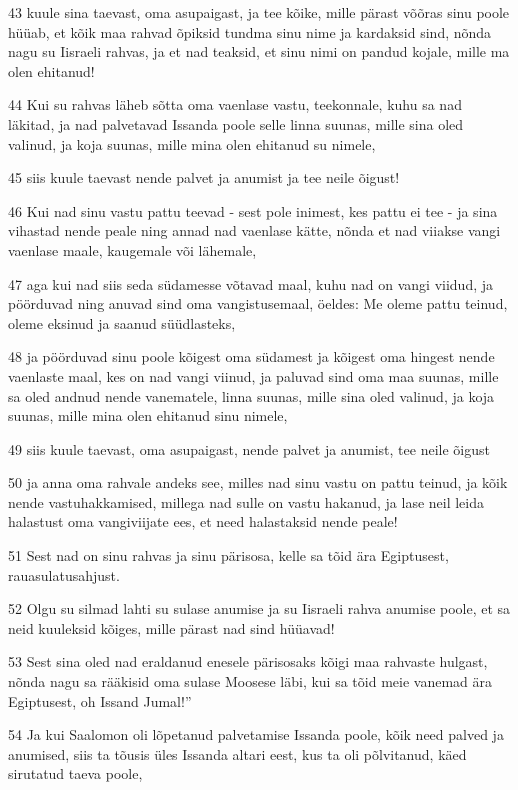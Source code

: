 \par 43 kuule sina taevast, oma asupaigast, ja tee kõike, mille pärast võõras sinu poole hüüab, et kõik maa rahvad õpiksid tundma sinu nime ja kardaksid sind, nõnda nagu su Iisraeli rahvas, ja et nad teaksid, et sinu nimi on pandud kojale, mille ma olen ehitanud!
\par 44 Kui su rahvas läheb sõtta oma vaenlase vastu, teekonnale, kuhu sa nad läkitad, ja nad palvetavad Issanda poole selle linna suunas, mille sina oled valinud, ja koja suunas, mille mina olen ehitanud su nimele,
\par 45 siis kuule taevast nende palvet ja anumist ja tee neile õigust!
\par 46 Kui nad sinu vastu pattu teevad - sest pole inimest, kes pattu ei tee - ja sina vihastad nende peale ning annad nad vaenlase kätte, nõnda et nad viiakse vangi vaenlase maale, kaugemale või lähemale,
\par 47 aga kui nad siis seda südamesse võtavad maal, kuhu nad on vangi viidud, ja pöörduvad ning anuvad sind oma vangistusemaal, öeldes: Me oleme pattu teinud, oleme eksinud ja saanud süüdlasteks,
\par 48 ja pöörduvad sinu poole kõigest oma südamest ja kõigest oma hingest nende vaenlaste maal, kes on nad vangi viinud, ja paluvad sind oma maa suunas, mille sa oled andnud nende vanematele, linna suunas, mille sina oled valinud, ja koja suunas, mille mina olen ehitanud sinu nimele,
\par 49 siis kuule taevast, oma asupaigast, nende palvet ja anumist, tee neile õigust
\par 50 ja anna oma rahvale andeks see, milles nad sinu vastu on pattu teinud, ja kõik nende vastuhakkamised, millega nad sulle on vastu hakanud, ja lase neil leida halastust oma vangiviijate ees, et need halastaksid nende peale!
\par 51 Sest nad on sinu rahvas ja sinu pärisosa, kelle sa tõid ära Egiptusest, rauasulatusahjust.
\par 52 Olgu su silmad lahti su sulase anumise ja su Iisraeli rahva anumise poole, et sa neid kuuleksid kõiges, mille pärast nad sind hüüavad!
\par 53 Sest sina oled nad eraldanud enesele pärisosaks kõigi maa rahvaste hulgast, nõnda nagu sa rääkisid oma sulase Moosese läbi, kui sa tõid meie vanemad ära Egiptusest, oh Issand Jumal!”
\par 54 Ja kui Saalomon oli lõpetanud palvetamise Issanda poole, kõik need palved ja anumised, siis ta tõusis üles Issanda altari eest, kus ta oli põlvitanud, käed sirutatud taeva poole,
